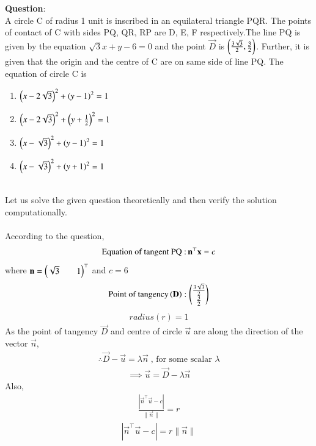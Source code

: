 \documentclass[journal]{IEEEtran}
\begin{document}
\textbf{Question}:\\
A circle C of radius 1 unit is inscribed in an equilateral triangle PQR. The points of contact of C with sides PQ, QR, RP are D, E, F respectively.The line PQ is given by the equation
$\sqrt{3}x+y-6=0$ and the point $\vec{D}$ is $\brak{\frac{3\sqrt{3}}{2},\frac{3}{2}}$. Further, it is given
that the origin and the centre of C are on same side of line PQ. The equation of circle C is
\begin{multicols}{2}
\begin{enumerate}
    \item $\brak{x-2\sqrt{3}}^2+\brak{y-1}^2=1$
    \item $\brak{x-2\sqrt{3}}^2+\brak{y+\frac{1}{2}}^2=1$
    \item $\brak{x-\sqrt{3}}^2+\brak{y-1}^2=1$
    \item $\brak{x-\sqrt{3}}^2+\brak{y+1}^2=1$
\end{enumerate}
\end{multicols}
\solution \\
Let us solve the given question theoretically and then verify the solution computationally.\\
\\
According to the question,
\begin{align}
    \text{Equation of tangent PQ :\,}\vec{n}^{\top}\vec{x}=c
\end{align}
where $\vec{n}=\myvec{\sqrt{3}&&1}^{\top}$ and $c=6$
\begin{align}
    \text{Point of tangency}\brak{\vec{D}}:\myvec{\frac{3\sqrt{3}}{2}\\\frac{3}{2}}
\end{align}
\begin{align}
    radius(r)=1
\end{align}
As the point of tangency $\vec{D}$ and centre of circle $\vec{u}$  are along the direction of the vector $\vec{n}$,
\begin{align}
    \therefore \vec{D}-\vec{u}=\lambda\vec{n}\;\text{, for some scalar $\lambda$}
\end{align}
\begin{align}
    \implies \vec{u}=\vec{D}-\lambda\vec{n}
\end{align}
Also,
\begin{align}
    \frac{|\vec{n}^{\top}\vec{u}-c|}{\|\vec{n}\|}=r
\end{align}
\begin{align}
    |\vec{n}^{\top}\vec{u}-c|=r\|\vec{n}\|
\end{align}
\end{document}
